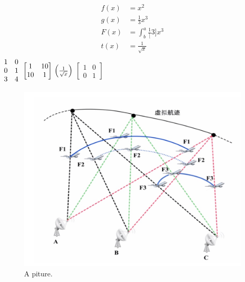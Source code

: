 \documentclass{article}
\begin{document}
    \begin{align*}
        f(x) &= x^2\\
        g(x) &= \frac{1}{3}x^3\\
        F(x) &= \int^a_b \frac{1}[3]x^3\\
        t(x) &= \frac{1}{\sqrt{x}}\\
    \end{align*}
    $\begin{matrix}
        1 & 0\\
        0 & 1\\
        3 & 4
    \end{matrix}\\
    \left[
        \begin{matrix}
            1 & 10\\
            10 & 1
        \end{matrix}
    \right]\\
    \left(\frac{1}{\sqrt{x}}\right)
    $
    $[
        \begin{matrix}
            1 & 0\\
            0 & 1
        \end{matrix}
    ]$
    \begin{figure}
        \includegraphics[width=\linewidth]{LatexTeample/test.jpg}
        \caption{A piture.}
        \label{fig:p1}
    \end{figure}
    
\end{document}
